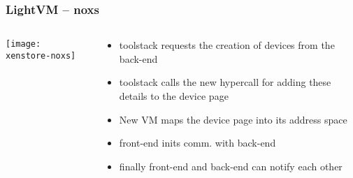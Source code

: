 \begin{frame}[plain]
	\frametitle{LightVM -- noxs }
	
	
	
	\begin{columns}
		
		\begin{column}{.5\textwidth}
			
			
			\centering
			\texttt{[image: xenstore-noxs]}
			
		\end{column}
		
		\begin{column}{.5\textwidth}
			
			\begin{itemize}			
				\item toolstack requests the creation of devices from the back-end
				\item toolstack calls the new hypercall for adding these details to the device page
				\item New VM maps the device page into its address space
				\item front-end inits comm. with back-end
				\item finally front-end and back-end can notify each other
				
				
			\end{itemize}
			
			
		\end{column}
		
		
	\end{columns}
	
	
\end{frame}


